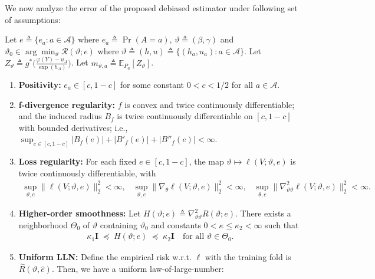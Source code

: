 We now analyze the error of the proposed debiased estimator under following set of assumptions: 
\begin{assumption}\label{assumption:regularity-condition-3}
    \normalfont
    Let $e \triangleq \{e_a: a \in \mathcal{A}\}$ where $e_a \triangleq \Pr(A=a)$, $\vartheta \triangleq (\beta,\gamma)$ and $\vartheta_0 \in \arg\min_{\vartheta} \mathcal{R}(\vartheta; e)$ where $\vartheta \triangleq (h,u) \triangleq  \{(h_a,u_a): a \in \mathcal{A}\}$. Let $Z_{\vartheta} \triangleq g^{\ast}\big( \tfrac{\varphi(Y) - u_A}{\exp(h_A)}\big)$. Let $m_{\vartheta,a} \triangleq \mathbb{E}_{P_a}[Z_{\vartheta}]$. 
    \begin{enumerate}[leftmargin=*]
        \item \textbf{Positivity:} $e_a \in [c,1-c]$ for some constant $ 0< c  < 1/2$ for all $a \in \mathcal{A} $. 
        \item \textbf{f-divergence regularity:} $f$ is convex and twice continuously differentiable; and the induced radius $B_f$ is twice continuously differentiable on $[c,1-c]$ with bounded derivatives; i.e., $\sup_{e \in [c,1-c]} |B_f(e)| + |B'_f(e)| + |B''_{f}(e)| < \infty $. 
        \item \textbf{Loss regularity:} For each fixed $e \in [c,1-c]$, the map $\vartheta \mapsto \ell(V;\vartheta,e)$ is twice continuously differentiable, with 
        \begin{align*}
            \sup_{\vartheta,e} \|\ell(V;\vartheta,e)\|^2_2 < \infty, \;\;\; \sup_{\vartheta,e} \|\nabla_\theta \ell(V;\vartheta,e)\|^2_2 < \infty, \;\;\; \sup_{\theta,e}\|\nabla^2_{\vartheta\vartheta}\ell(V;\vartheta,e)\|^2_2 < \infty.
        \end{align*}
        \item \textbf{Higher-order smoothness:} Let $H(\vartheta; e) \triangleq \nabla^{2}_{\vartheta\vartheta}R(\vartheta; e)$. There exists a neighborhood $\varTheta_0$ of $\vartheta$ containing $\vartheta_0$ and constants $0 < \kappa \leq \kappa_2 < \infty$ such that 
        \begin{align}
            \kappa_1 \mathbf{I} \;\preceq\; H(\vartheta; e) \;\preceq\; \kappa_2 \mathbf{I} \quad\text{for all }\vartheta\in\varTheta_0.
        \end{align}
        \item \textbf{Uniform LLN:} Define the empirical risk w.r.t. $\ell$ with the training fold is $\widehat{R}(\vartheta, \widehat{e})$. Then, we have a uniform law-of-large-number:
        \begin{align}

\end{align}
\end{enumerate}
\end{assumption}
